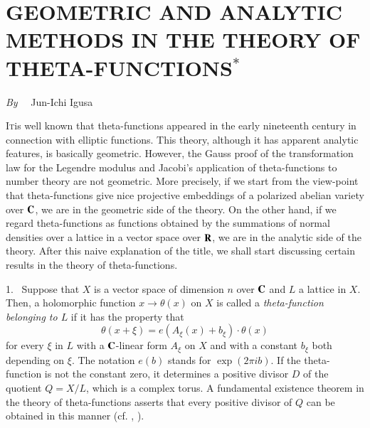 \chapter[\textsc{J-I. Igusa~:} Geometric and Analytic Methods in the Theory of Theta-Functions]{GEOMETRIC AND ANALYTIC METHODS IN THE THEORY OF THETA-FUNCTIONS$^{*}$}\label{art12}

\begin{center}
{\em By}~~ Jun-Ichi Igusa
\end{center}


\setcounter{pageoriginal}{240}
\textsc{It}\pageoriginale is well known that theta-functions appeared in the early nineteenth century in connection with elliptic functions. This theory, although it has apparent analytic features, is basically geometric. However, the Gauss proof of the transformation law for the Legendre modulus and Jacobi's application of theta-functions to number theory are not geometric. More precisely, if we start from the view-point that theta-functions give nice projective embeddings of a polarized abelian variety over $\mathbf{C}$, we are in the geometric side of the theory. On the other hand, if we regard theta-functions as functions obtained by the summations of normal densities over a lattice in a vector space over $\mathbf{R}$, we are in the analytic side of the theory. After this naive explanation of the title, we shall start discussing certain results in the theory of theta-functions.

1.~ Suppose that $X$ is a vector space of dimension $n$ over $\mathbf{C}$ and $L$ a lattice in $X$. Then, a holomorphic function $x\to \theta(x)$ on $X$ is called a {\em theta-function belonging to $L$} if it has the property that
$$
\theta(x+\xi)=e(A_{\xi}(x)+b_{\xi})\cdot \theta(x)
$$
for every $\xi$ in $L$ with a $\mathbf{C}$-linear form $A_{\xi}$ on $X$ and with a constant $b_{\xi}$ both depending on $\xi$. The notation $e(b)$ stands for $\exp(2\pi ib)$. If the theta-function is not the constant zero, it determines a positive divisor $D$ of the quotient $Q=X/L$, which is a complex torus. A fundamental existence theorem in the theory of theta-functions asserts that every positive divisor of $Q$ can be obtained in this manner (cf. \cite{art12-key23}, \cite{art12-key24}).

